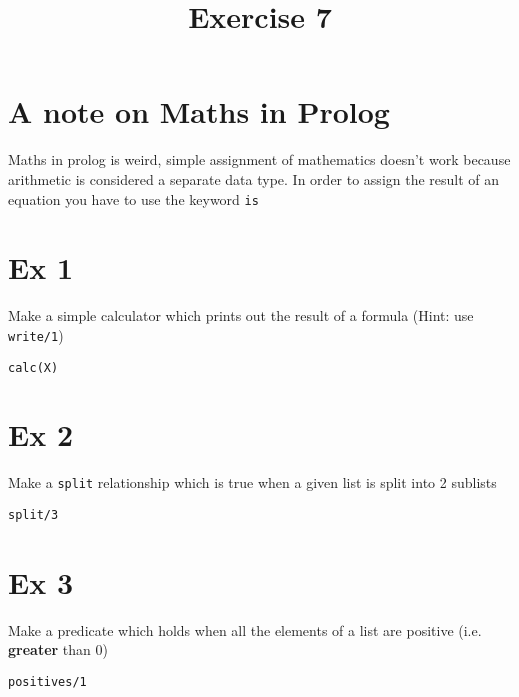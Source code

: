 \documentclass{article}
\title{Exercise 7}
\begin{document}
\maketitle
\section{A note on Maths in Prolog}

Maths in prolog is weird, simple assignment of mathematics doesn't work because
arithmetic is considered a separate data type. In order to assign the result of
an equation you have to use the keyword \verb|is|

\section{Ex 1}

Make a simple calculator which prints out the result of a formula (Hint: use
\verb|write/1|)

\verb|calc(X)|

\section{Ex 2}

Make a \verb|split| relationship which is true when a given list is split into 2
sublists

\verb|split/3|

\section{Ex 3}

Make a predicate which holds when all the elements of a list are positive (i.e.
\textbf{greater} than 0)

\verb|positives/1|
\end{document}
